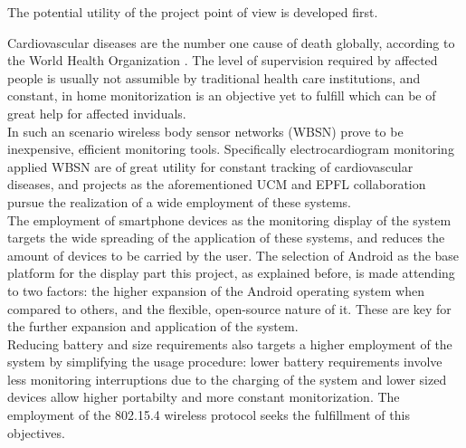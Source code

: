 		The potential utility of the project point of view is developed first.\\

		\begin{comment}
		x CardioVascular Diseases (CVD) as high risk, expanded cause of death (citamos a la OMS)
		x WBSN as a cheap, efficient method of monitoring, particularly ECG monitoring for CVD preventing.
		x Smartphones as ubiquous monitoring window.
		x EPFL's shimmer + iPhone bluetooth monitoring system.
		x Bluetooth battery requirements don't suffice for expected device usage time.
		x 802.15.4 as a more efficient alternative.
		x Smartphones not equipped with 802.15.4 -> Development of a receiver device.
		x Android as more open, flexible, expanded platform than iOS.
		x .·. Android + 802.15.4 (through a receiver device) + shimmer for continous ECG monitoring.
		\end{comment}

		Cardiovascular diseases are the number one cause of death globally, according to the World Health Organization \cite{who-cvd}. The level of supervision required by affected people is usually not assumible by traditional health care institutions, and constant, in home monitorization is an objective yet to fulfill which can be of great help for affected inviduals.\\

		In such an scenario wireless body sensor networks (WBSN) prove to be inexpensive, efficient monitoring tools. Specifically electrocardiogram monitoring applied WBSN are of great utility for constant tracking of cardiovascular diseases, and projects as the aforementioned UCM and EPFL collaboration pursue the realization of a wide employment of these systems.\\

		The employment of smartphone devices as the monitoring display of the system targets the wide spreading of the application of these systems, and reduces the amount of devices to be carried by the user. The selection of Android as the base platform for the display part this project, as explained before, is made attending to two factors: the higher expansion of the Android operating system when compared to others, and the flexible, open-source nature of it. These are key for the further expansion and application of the system.\\

		Reducing battery and size requirements also targets a higher employment of the system by simplifying the usage procedure: lower battery requirements involve less monitoring interruptions due to the charging of the system and lower sized devices allow higher portabilty and more constant monitorization. The employment of the 802.15.4 wireless protocol seeks the fulfillment of this objectives.\\

